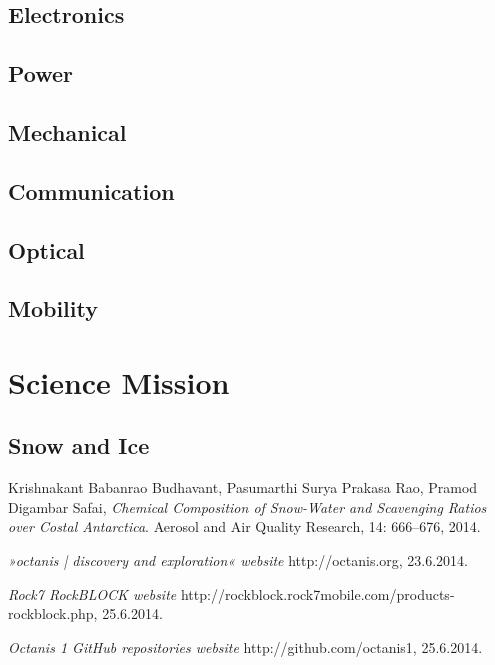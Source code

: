 \documentclass[a4paper,12pt]{article}
\begin{document}
\subsection{Electronics}
\subsection{Power}
\subsection{Mechanical}
\subsection{Communication}
\subsection{Optical}
\subsection{Mobility}


\section{Science Mission}

\subsection{Snow and Ice}

\cite{krishnakant} 


\pagebreak
\pagestyle{empty}
\begin{thebibliography}{1}


  Krishnakant Babanrao Budhavant, Pasumarthi Surya Prakasa Rao, Pramod Digambar Safai,
  \emph{Chemical Composition of Snow-Water and Scavenging Ratios over Costal Antarctica}.
  Aerosol and Air Quality Research, 14: 666–676, 2014.

{\em »octanis | discovery and exploration« website} http://octanis.org, 23.6.2014.

{\em Rock7 RockBLOCK website} http://rockblock.rock7mobile.com/products-rockblock.php, 25.6.2014.


{\em Octanis 1 GitHub repositories website} http://github.com/octanis1, 25.6.2014.

 

\end{thebibliography}
\end{document}
